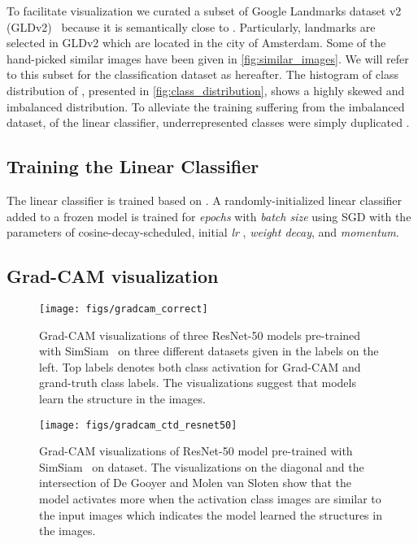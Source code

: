 \documentclass[a4paper,conference]{IEEEtran}
\begin{document}
To facilitate visualization  we curated a subset of Google Landmarks dataset v2 (GLDv2)~\cite{weyand2020google} because it is semantically close to \amstertime. Particularly,  landmarks are selected in GLDv2 which are located in the city of Amsterdam. Some of the hand-picked similar images have been given in \cref{fig:similar_images}. We will refer to this subset for the classification dataset as \textit{\amsterdam} hereafter. The histogram of class distribution of \amsterdam,  presented in  \cref{fig:class_distribution}, shows a highly skewed and imbalanced distribution. To alleviate the training suffering from the imbalanced dataset, of the linear classifier, underrepresented classes were simply duplicated \amsterdam.


\subsection{Training the Linear Classifier}
The linear classifier is trained based on \cite{chen2020simsiam}. A randomly-initialized linear classifier added to a frozen model is trained for  {\textit{epochs}} with {\textit{batch size}} using SGD  with the parameters of cosine-decay-scheduled, initial \textit{lr} , \textit{weight decay}, and \textit{momentum}.  


\subsection{Grad-CAM visualization}

\begin{figure}[t]
\centering
\texttt{[image: figs/gradcam\_correct]}
\caption{Grad-CAM visualizations of three ResNet-50 models pre-trained with SimSiam~\cite{chen2020simsiam} on three different datasets given in the labels on the left. Top labels denotes both class activation for Grad-CAM and grand-truth class labels. The visualizations suggest that models learn the structure in the images.}
\label{fig:gradcam_simsiam}
\end{figure}

\begin{figure}[t]
\centering
\texttt{[image: figs/gradcam\_ctd\_resnet50]}
\caption{Grad-CAM visualizations of ResNet-50 model pre-trained with SimSiam~\cite{chen2020simsiam} on \amstertime dataset. The visualizations on the diagonal and the intersection of De Gooyer and Molen van Sloten show that the model activates more when the activation class images are similar to the input images which indicates the model learned the structures in the images.}
\label{fig:gradcam_amstertime}
\end{figure}
\end{document}
